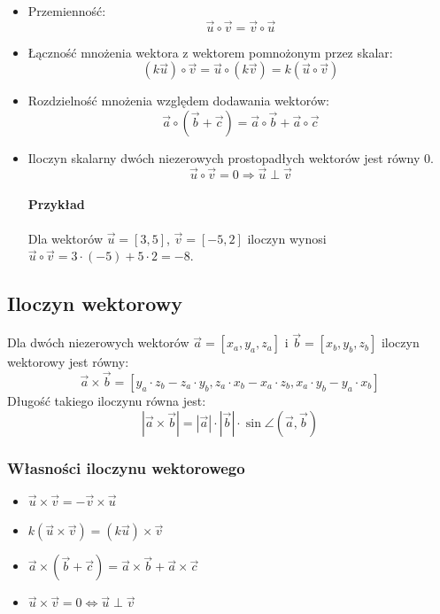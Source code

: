 \documentclass [a4paper, 12pt, oneside]{article}
\newcommand{\vect}[1]{\overrightarrow{#1}}
\begin{document}
\begin{itemize}
    \item Przemienność:
    $$\vect u \circ \vect v = \vect v \circ \vect u$$
    \item Łączność mnożenia wektora z wektorem pomnożonym przez skalar:
    $$\left(k\vect u\right)\circ\vect v = \vect u \circ \left(k\vect v\right) = k\left(\vect u \circ \vect v\right)$$
    \item Rozdzielność mnożenia względem dodawania wektorów:
    \[
        \vect a \circ \left( \vect b + \vect c\right) = \vect a \circ \vect b + \vect a \circ \vect c
    \]
    \item Iloczyn skalarny dwóch niezerowych prostopadłych wektorów jest równy 0.
    \[
        \vect u \circ \vect v = 0 \Rightarrow \vect u \perp \vect v
    \]

\paragraph{Przykład} Dla wektorów $\vect u = [3,5]$, $\vect v = [-5,2]$ iloczyn wynosi $\vect u \circ \vect v = 3\cdot(-5) + 5\cdot 2 = -8$.
\end{itemize}

\subsection*{Iloczyn wektorowy}

Dla dwóch niezerowych wektorów $\vect a = [x_a, y_a, z_a]$ i $\vect b = [x_b, y_b, z_b]$ iloczyn wektorowy jest równy:
\[
    \vect a \times \vect b = [y_a\cdot z_b - z_a\cdot y_b, z_a\cdot x_b - x_a\cdot z_b, x_a\cdot y_b - y_a\cdot x_b]
\]
Długość takiego iloczynu równa jest:
\[
    \left| \vect a \times \vect b \right| = \left|\vect a\right| \cdot \left|\vect b\right| \cdot \sin\angle\left(\vect a, \vect b\right)
\]
\subsubsection*{Własności iloczynu wektorowego}
\begin{itemize}
    \item $\vect u \times \vect v = -\vect v \times \vect u$
    \item $k\left(\vect u \times \vect v\right) = \left(k\vect u\right) \times \vect v$
    \item $\vect a \times \left(\vect b +\vect c\right) = \vect a \times \vect b + \vect a \times \vect c$
    \item $\vect u \times \vect v = 0 \Leftrightarrow \vect u \perp \vect v$
\end{itemize}
\end{document}
